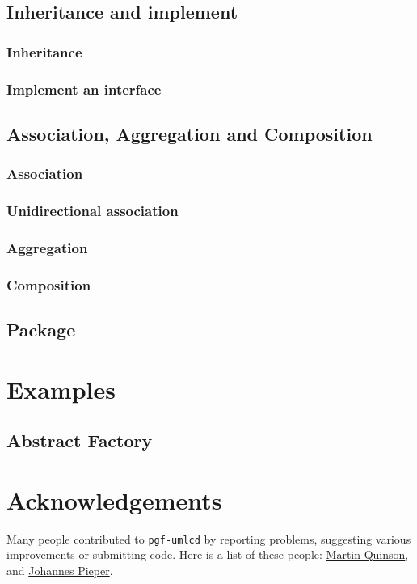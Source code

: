 \documentclass{article}
\newcommand{\demo}[2][1]{
\begin{minipage}{.49\linewidth}
\centering
\resizebox{#1\linewidth}{!}{

}
\end{minipage}
\hspace{0.01\linewidth}
\begin{minipage}{.5\linewidth}

\end{minipage}
}
\newcommand{\example}[1]{
\resizebox{\linewidth}{!}{

}

}
\begin{document}
\subsection{Inheritance and implement}
\subsubsection{Inheritance}
\demo{inheritance}
 
\subsubsection{Implement an interface}
\demo{implement-interface}

\subsection{Association, Aggregation and Composition}
\subsubsection{Association} 
\demo{association}
 
\subsubsection{Unidirectional association}
\demo{unidirectional-association}

\subsubsection{Aggregation}
\demo{aggregation}

\subsubsection{Composition}
\demo{composition}

\subsection{Package}
\demo{package}

\section{Examples}
\subsection{Abstract Factory}
\example{abstract-factory}

\section{Acknowledgements}
Many people contributed to \texttt{pgf-umlcd} by reporting problems,
suggesting various improvements or submitting code. Here is a list of
these people: \href{mailto:martin.quinson@loria.fr}{Martin Quinson},
and \href{mailto:johannes_pieper@yahoo.de}{Johannes Pieper}.
\end{document}

